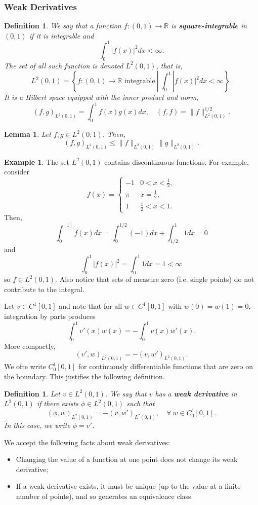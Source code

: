 \documentclass{article}
\newtheorem{lemma}[theorem]{Lemma}
\newtheorem{definition}[theorem]{Definition}
\theoremstyle{definition}
\newtheorem{example}[theorem]{Example}
\theoremstyle{definition}
\newcommand{\R}{\mathbb{R}}
\begin{document}
\subsubsection{Weak Derivatives}
\begin{definition}
    We say that a function $f:(0,1)\to \R$ is \textbf{square-integrable} in $(0,1)$ if it is integrable and
    $$\int_{0}^{1}|f(x)|^2dx<\infty.$$
    The set of all such function is denoted $L^2(0,1)$, that is,
    $$L^2(0,1)=\left\{f:(0,1)\to \R \text{ integrable}\:|\:\int_{0}^{1}|f(x)|^2dx<\infty\right\}.$$
    It is a Hilbert space equipped with the inner product and norm,
    $$(f,g)_{L^2(0,1)}=\int_{0}^{1}f(x)g(x)dx,\quad (f,f)=\|f\|_{L^2(0,1)}^{1/2}.$$
\end{definition}
\begin{lemma}
    Let $f,g\in L^2(0,1)$. Then,
    $$(f,g)_{L^2(0,1)}\leq \|f\|_{L^2(0,1)}\|g\|_{L^2(0,1)}.$$
\end{lemma}
\begin{example}
    The set $L^2(0,1)$ contains discontinuous functions. For example, consider
    $$f(x)=\begin{cases}
        -1&0<x<\frac{1}{2},\\
        \pi&x=\frac{1}{2},\\
        1&\frac{1}{2}<x<1.
    \end{cases}$$
    Then,
    $$\int_{0}^[1]f(x)dx=\int_{0}^{1/2}(-1)dx+\int_{1/2}^{1}1dx=0$$
    and
    $$\int_{0}^{1}|f(x)|^2=\int_{0}^{1}1dx=1<\infty$$
    so $f\in L^2(0,1)$. Also notice that sets of measure zero (i.e. single points) do not contribute to the integral.
\end{example}
Let $v\in C^1[0,1]$ and note that for all $w\in C^1[0,1]$ with $w(0)=w(1)=0$, integration by parts produces
$$\int_{0}^{1}v'(x)w(x)=-\int_{0}^{1}v(x)w'(x).$$
More compactly,
$$(v',w)_{L^2(0,1)}=-(v,w')_{L^2(0,1)}.$$
We ofte write $C^1_0[0,1]$ for continuously differentiable functions that are zero on the boundary.
This justifies the following definition.
\begin{definition}
    Let $v\in L^2(0,1)$. We say that $v$ has a \textbf{weak derivative} in $L^2(0,1)$ if there exists $\phi\in L^2(0,1)$ such that
    $$(\phi,w)_{L^2(0,1)}=-(v,w')_{L^2(0,1)},\quad \forall\:w\in C^1_0[0,1].$$
    In this case, we write $\phi=v'$.
\end{definition}
We accept the following facts about weak derivatives:
\begin{itemize}
    \item Changing the value of a function at one point does not change its weak
derivative;
\item If a weak derivative exists, it must be unique (up to the value at a finite
number of points), and so generates an equivalence class.
\end{itemize}
\end{document}
